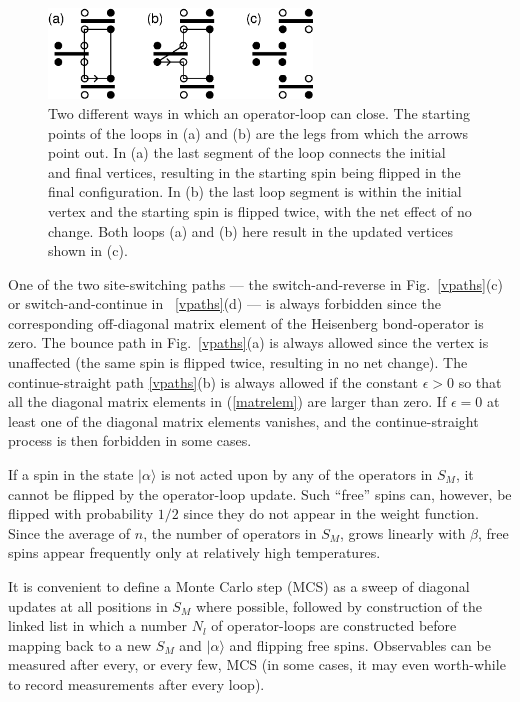 \documentclass[10pt,pre,aps,twocolumn,showpacs,superscriptaddress,
floatfix]{revtex4}
\begin{document}
\begin{figure}
\includegraphics[clip,width=7cm]{fig4.eps}
\caption{Two different ways in which an operator-loop can close. The starting 
points of the loops in (a) and (b) are the legs from which the arrows point 
out. In (a) the last segment of the loop connects the initial and final 
vertices, resulting in the starting spin being flipped in the final
configuration. In (b) the last loop segment is within the initial vertex and 
the starting spin is flipped twice, with the net effect of no change. Both 
loops (a) and (b) here result in the updated vertices shown in (c).}
\label{closings}
\end{figure}

One of the two site-switching paths --- the switch-and-reverse in
Fig.~\ref{vpaths}(c) or switch-and-continue in ~\ref{vpaths}(d) --- 
is always forbidden since the corresponding off-diagonal matrix element 
of the Heisenberg bond-operator is zero. The bounce path in 
Fig.~\ref{vpaths}(a) is always allowed since the vertex is unaffected (the 
same spin is flipped twice, resulting in no net change). The 
continue-straight path \ref{vpaths}(b) is always allowed if the constant 
$\epsilon > 0$ so that all the diagonal matrix elements in (\ref{matrelem}) 
are larger than zero. If $\epsilon = 0$ at least one of the diagonal matrix 
elements vanishes, and the continue-straight process is then forbidden 
in some cases.

If a spin in the state $|\alpha \rangle$ is not acted upon by any of the
operators in $S_M$, it cannot be flipped by the operator-loop update.
Such ``free'' spins can, however, be flipped with probability $1/2$
since they do not appear in the weight function. Since the average of $n$, 
the number of operators in $S_M$, grows linearly with $\beta$, free spins 
appear frequently only at relatively high temperatures.

It is convenient to define a Monte Carlo step (MCS) as a sweep of diagonal
updates at all positions in $S_M$ where possible, followed by construction
of the linked list in which a number $N_l$ of operator-loops are constructed
before mapping back to a new $S_M$ and $|\alpha \rangle$ and flipping free
spins. Observables can be measured after every, or every few, MCS (in some 
cases, it may even worth-while to record measurements after every loop).
\end{document}

